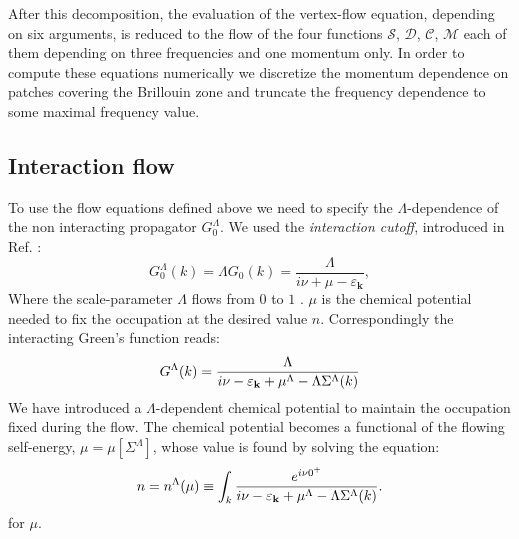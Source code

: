After this decomposition, the evaluation of the vertex-flow equation, depending on six arguments, is reduced to the flow of the four functions $\mathcal{S}$, $\mathcal{D}$, $\mathcal{C}$, $\mathcal{M}$ 
each of them depending on three frequencies and one momentum only. In order to compute these equations numerically we discretize the momentum 
dependence on patches covering the Brillouin zone and truncate the frequency dependence to some maximal frequency value.

\subsection{Interaction flow}
\label{sec:IntFlow}
To use the flow equations defined above we need to specify the $\Lambda$-dependence of the non interacting propagator $G_0^\Lambda$.
We used the \textit{interaction cutoff}, introduced in Ref. :
 \begin{equation}
 G_0^\Lambda(k) = \Lambda G_0(k)=\frac{\Lambda}{i\nu+\mu-\varepsilon_{\mathbf{k}} } , 
 \end{equation}
  Where the scale-parameter $\Lambda$ flows from $0$ to $1$%
. $\mu$ is the chemical potential needed to fix the occupation at the desired value $n$. Correspondingly the interacting Green's function reads: 
\begin{equation}
G^\Lambda (k) = \frac{\Lambda}{i\nu - \varepsilon_{\mathbf{k}} +\mu^{\Lambda}-\Lambda\Sigma^\Lambda(k)} 
\end{equation} 
We have introduced a $\Lambda$-dependent chemical potential to maintain the occupation fixed during the flow. The chemical potential becomes a functional of the flowing self-energy, $\mu=\mu[\Sigma^\Lambda]$, whose value is found by solving the equation:  
\begin{equation}
n = n^{\Lambda}(\mu) \equiv \int_k \frac{e^{i\nu 0^{+}}} {i\nu - \varepsilon_{\mathbf{k}} +\mu^{\Lambda}-\Lambda\Sigma^\Lambda(k)}. 
\end{equation} 
for $\mu$.  

